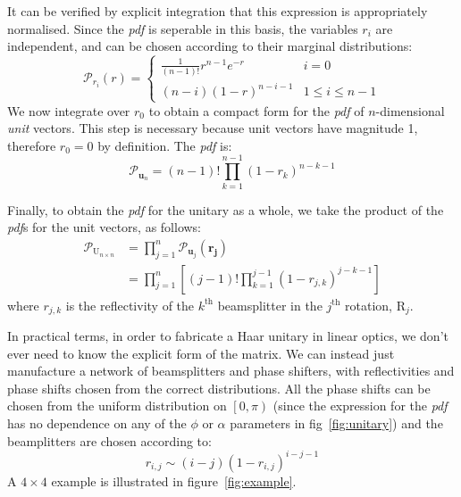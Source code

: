 \documentclass[aps,prl,twocolumn]{revtex4}
\renewcommand{\vec}[1]{\mathbf{#1}}
\newcommand{\mat}[1]{\mathrm{#1}}
\newcommand{\by}{\times}
\newcommand{\of}[1]{\!\left(#1\right)}
\newcommand{\pdf}{{\it pdf}}
\newcommand{\prob}[1]{\mathcal{#1}}
\begin{document}
It can be verified by explicit integration that this expression is appropriately
normalised. Since the \pdf{ } is seperable in this basis, the variables \( r_i
\) are independent, and can be chosen according to their marginal distributions:
\begin{equation}
  \prob{P}_{r_i} \of{ r } = \left\{ \begin{matrix}
    \frac{1}{ \left( n-1 \right)! } r^{n-1} e^{-r} & i=0 \\
    \left( n-i \right) \left( 1-r \right)^{n-i-1} & 1 \leq i \leq n-1
  \end{matrix} \right.
\end{equation}
We now integrate over \(r_{0}\) to obtain a compact form for the \pdf{ } of
\(n\)-dimensional \emph{unit} vectors. This step is necessary because unit
vectors have magnitude 1, therefore \(r_0=0\) by definition. The \pdf{ } is:
\begin{equation}
  \prob{P}_{ \vec{u}_n } = \left( n-1 \right)! \prod_{k=1}^{n-1} \left( 1-r_k
  \right)^{n-k-1}
\end{equation}

Finally, to obtain the \pdf{ } for the unitary as a whole, we take the product
of the \pdf s for the unit vectors, as follows:
\begin{align*}
  \prob{P}_{\mat{U}_{n \by n}} &= \prod_{j=1}^{n} \prob{P}_{\vec{u}_j}
  \of{\vec{r_j}} \\
  &= \prod_{j=1}^{n} \left[ \left( j-1 \right)! \prod_{k=1}^{j-1} \left(
  1-r_{j,k} \right)^{j-k-1} \right]
\end{align*}
where \( r_{j,k} \) is the reflectivity of the \( k^{\text{th}} \) beamsplitter
in the \( j^{\text{th}} \) rotation, \( \mat{R}_j \).

In practical terms, in order to fabricate a Haar unitary in linear optics, we
don't ever need to know the explicit form of the matrix. We can instead just
manufacture a network of beamsplitters and phase shifters, with reflectivities
and phase shifts chosen from the correct distributions. All the phase shifts can
be chosen from the uniform distribution on \( \left[ 0,\pi \right) \) (since the
expression for the \pdf{ }has no dependence on any of the \(\phi\) or \(\alpha\)
parameters in fig~\ref{fig:unitary}) and the
beamplitters are chosen according to:
\begin{equation}
  r_{i,j} \sim \left( i-j \right) \left( 1-r_{i,j} \right)^{i-j-1}
\end{equation}
A \( 4 \by 4 \) example is illustrated in figure~\ref{fig:example}.
\end{document}
